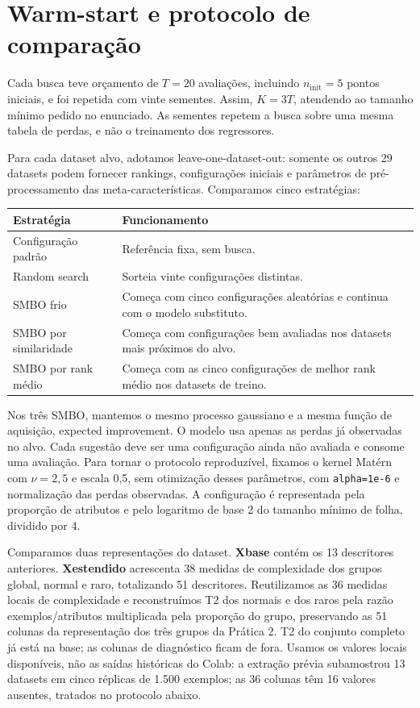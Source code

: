 \documentclass[10pt,a4paper]{article}
\begin{document}
\section{Warm-start e protocolo de comparação}

Cada busca teve orçamento de $T=20$ avaliações, incluindo $n_{\mathrm{init}}=5$ pontos iniciais, e foi repetida com vinte sementes. Assim, $K=3T$, atendendo ao tamanho mínimo pedido no enunciado. As sementes repetem a busca sobre uma mesma tabela de perdas, e não o treinamento dos regressores.

Para cada dataset alvo, adotamos leave-one-dataset-out: somente os outros 29 datasets podem fornecer rankings, configurações iniciais e parâmetros de pré-processamento das meta-características. Comparamos cinco estratégias:

\begin{center}\small
\begin{tabularx}{\linewidth}{lY}
\toprule
Estratégia & Funcionamento \\
\midrule
Configuração padrão & Referência fixa, sem busca. \\
Random search & Sorteia vinte configurações distintas. \\
SMBO frio & Começa com cinco configurações aleatórias e continua com o modelo substituto. \\
SMBO por similaridade & Começa com configurações bem avaliadas nos datasets mais próximos do alvo. \\
SMBO por rank médio & Começa com as cinco configurações de melhor rank médio nos datasets de treino. \\
\bottomrule
\end{tabularx}
\end{center}

Nos três SMBO, mantemos o mesmo processo gaussiano e a mesma função de aquisição, expected improvement. O modelo usa apenas as perdas já observadas no alvo. Cada sugestão deve ser uma configuração ainda não avaliada e consome uma avaliação. Para tornar o protocolo reproduzível, fixamos o kernel Matérn com $\nu=2{,}5$ e escala 0,5, sem otimização desses parâmetros, com \texttt{alpha=1e-6} e normalização das perdas observadas. A configuração é representada pela proporção de atributos e pelo logaritmo de base 2 do tamanho mínimo de folha, dividido por 4.

Comparamos duas representações do dataset. \textbf{Xbase} contém os 13 descritores anteriores. \textbf{Xestendido} acrescenta 38 medidas de complexidade dos grupos global, normal e raro, totalizando 51 descritores. Reutilizamos as 36 medidas locais de complexidade e reconstruímos T2 dos normais e dos raros pela razão exemplos/atributos multiplicada pela proporção do grupo, preservando as 51 colunas da representação dos três grupos da Prática 2. T2 do conjunto completo já está na base; as colunas de diagnóstico ficam de fora. Usamos os valores locais disponíveis, não as saídas históricas do Colab: a extração prévia subamostrou 13 datasets em cinco réplicas de 1.500 exemplos; as 36 colunas têm 16 valores ausentes, tratados no protocolo abaixo.
\end{document}
